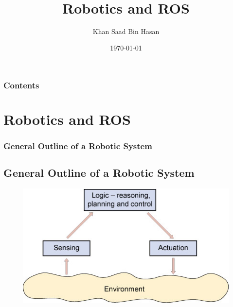 \documentclass{beamer}
\title[ROS]{Robotics and ROS} %
\author{Khan Saad Bin Hasan} %
\institute[] %
{
khansaadbinhasan.github.io \\ %
\medskip
\textit{khansaadbinhasan@gmail.com} %
}
\date{\today} %
\begin{document}
	\begin{frame}
	\titlepage %
	\end{frame}




	\begin{frame}
	\frametitle{Contents} %
	\tableofcontents %
	\end{frame}




	\section{Robotics and ROS}
	\begin{frame}
		\frametitle{General Outline of a Robotic System}
		\subsection{General Outline of a Robotic System}
		\begin{figure}
			\includegraphics[width=0.8\linewidth]{images/sensing-logic-actuation.jpg}
		\end{figure}
	\end{frame}
\end{document}
